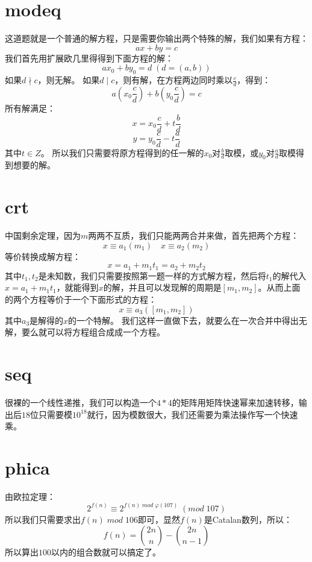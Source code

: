 \documentclass{article}
\begin{document}
	\section{modeq}
	 这道题就是一个普通的解方程，只是需要你输出两个特殊的解，我们如果有方程：
	$$
		ax + by = c
	$$
	我们首先用扩展欧几里得得到下面方程的解：
	$$
		ax_0 + by_0 = d \; ( d = (a,b) )
	$$
	如果$ d \nmid c $，则无解。
	如果$ d \mid c $，则有解，在方程两边同时乘以$ \frac{c}{d} $，得到：
	$$
		a(x_0\frac{c}{d}) + b(y_0\frac{c}{d}) = c
	$$
	所有解满足：
	$$
		x = x_0\frac{c}{d} + t\frac{b}{d}
	$$
	$$
		y = y_0\frac{c}{d} - t\frac{a}{d}
	$$
	其中$t \in Z$。
	所以我们只需要将原方程得到的任一解的$x_0$对$\frac{b}{d}$取模，或$y_0$对$\frac{a}{d}$取模得到想要的解。
	
	\section{crt}
	中国剩余定理，因为$m$两两不互质，我们只能两两合并来做，首先把两个方程：
	$$
		x \equiv a_1 ( m_1 ) \quad x \equiv a_2 ( m_2 ) 
	$$
	等价转换成解方程：
	$$
		x = a_1 + m_1t_1 = a_2 + m_2t_2 
	$$
	其中$t_1, t_2$是未知数，我们只需要按照第一题一样的方式解方程，然后将$t_1$的解代入$x = a_1 + m_1t_1$，就能得到$x$的解，并且可以发现解的周期是$[m_1,m_2]$。从而上面的两个方程等价于一个下面形式的方程：
	$$
		x \equiv a_3 ( [m_1,m_2] )
	$$
	其中$a_3$是解得的$x$的一个特解。
	我们这样一直做下去，就要么在一次合并中得出无解，要么就可以将方程组合成成一个方程。
	
	\section{seq}
	很裸的一个线性递推，我们可以构造一个$4 * 4$的矩阵用矩阵快速幂来加速转移，输出后$18$位只需要模$10^{18}$就行，因为模数很大，我们还需要为乘法操作写一个快速乘。
	
	\section{phica}
	由欧拉定理：
	$$
		2^{f(n)} \equiv 2^{f(n) \; mod \; \varphi(107) } \; (mod \; 107)
	$$
	所以我们只需要求出$f(n) \; mod \; 106$即可，显然$f(n)$是Catalan数列，所以：
	$$
		f(n) = \binom{2n}{n} - \binom{2n}{n-1}
	$$
	所以算出$100$以内的组合数就可以搞定了。
\end{document}
